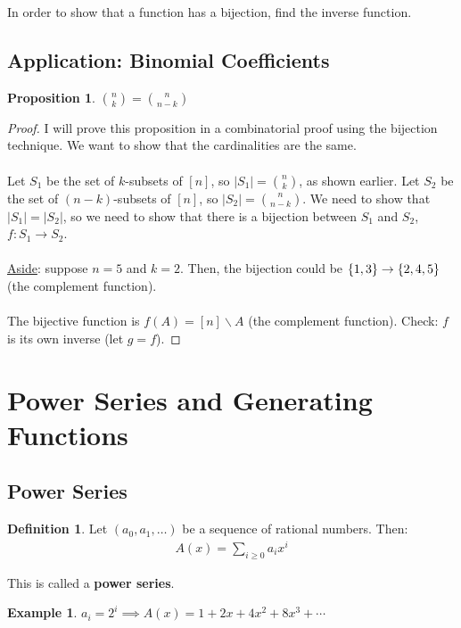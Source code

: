 \documentclass[]{article}
\newtheorem*{proposition}{Proposition}
\theoremstyle{definition}
\newtheorem*{defn}{Definition}
\newtheorem{ex}{Example}[section]
\DeclarePairedDelimiter{\set}{\lbrace}{\rbrace}
\begin{document}
			In order to show that a function has a bijection, find the inverse function.
			
			\subsection{Application: Binomial Coefficients}
				\begin{proposition}
					$\displaystyle \binom{n}{k} = \binom{n}{n - k}$
				\end{proposition}
				
				\begin{proof}
					I will prove this proposition in a combinatorial proof using the bijection technique. We want to show that the cardinalities are the same. 
					\\ \\
					Let $S_1$ be the set of $k$-subsets of $[n]$, so $|S_1| = \binom{n}{k}$, as shown earlier. Let $S_2$ be the set of $(n-k)$-subsets of $[n]$, so $|S_2| = \binom{n}{n - k}$. We need to show that $|S_1| = |S_2|$, so we need to show that there is a bijection between $S_1$ and $S_2$, $f: S_1 \to S_2$.
					\\ \\
					\underline{Aside}: suppose $n = 5$ and $k = 2$. Then, the bijection could be $\set{1, 3} \to \set{2, 4, 5}$ (the complement function).
					\\ \\
					The bijective function is $f(A) = [n]\backslash A$ (the complement function). Check: $f$ is its own inverse (let $g = f$).
				\end{proof}
				
	\section{Power Series and Generating Functions}
		\subsection{Power Series}
			\begin{defn}
					Let $(a_0, a_1, \ldots)$ be a sequence of rational numbers. Then:
					\begin{align*}
						A(x) = \sum_{i \ge 0} a_i x^i
					\end{align*}
					
					This is called a \textbf{power series}.
			\end{defn}
			
			\begin{ex}
				$a_i = 2^i \implies A(x) = 1 + 2x + 4x^2 + 8x^3 + \cdots$
			\end{ex}
\end{document}
